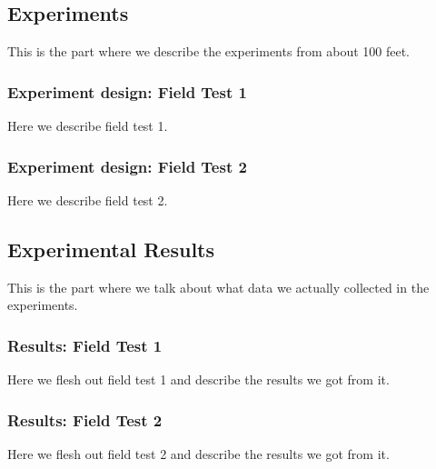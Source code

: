 \subsection{Experiments}
This is the part where we describe the experiments from about 100 feet.

\subsubsection{Experiment design: Field Test 1}
Here we describe field test 1.

\subsubsection{Experiment design: Field Test 2}
Here we describe field test 2.

\subsection{Experimental Results}
This is the part where we talk about what data we actually collected in the
experiments.

\subsubsection{Results: Field Test 1}
Here we flesh out field test 1 and describe the results we got from it.

\subsubsection{Results: Field Test 2}
Here we flesh out field test 2 and describe the results we got from it.
